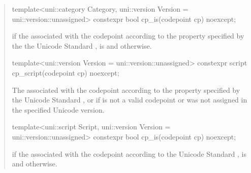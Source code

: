 \documentclass{wg21}
\begin{document}
\begin{quote}
\begin{itemdescr}
\end{itemdescr}


\begin{itemdecl}
template<uni::category Category, uni::version Version = uni::version::unassigned>
constexpr bool cp_is(codepoint cp) noexcept;
\end{itemdecl}

\begin{itemdescr}

\mandates {}

\returns {} if the  associated with the codepoint  according to the  property specified by the the Unicode Standard ,
is   and  otherwise.

\end{itemdescr}


\begin{itemdecl}
template<uni::version Version = uni::version::unassigned>
constexpr script cp_script(codepoint cp) noexcept;
\end{itemdecl}

\begin{itemdescr}

\mandates {}

\returns The  associated with the codepoint  according to the  property specified by the Unicode Standard ,
or  if  is not a valid codepoint or was not assigned in the specified Unicode version.

\end{itemdescr}

\begin{itemdecl}
template<uni::script Script, uni::version Version = uni::version::unassigned>
constexpr bool cp_is(codepoint cp) noexcept;
\end{itemdecl}

\begin{itemdescr}

\mandates {}

\returns {} if the  associated with the codepoint  according to the Unicode Standard ,
is   and  otherwise.


\end{itemdescr}
\end{quote}
\end{document}
